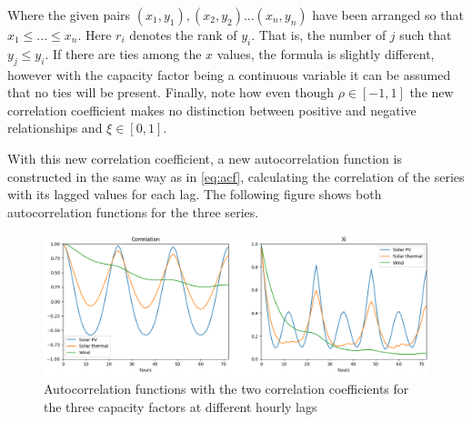 Where the given pairs $\left(x_1,y_1\right), \left(x_2,y_2\right)...\left(x_n,y_n\right)$ have been arranged so that $x_1 \leq...\leq x_n$. Here $r_i$ denotes the rank of $y_i$. That is, the number of $j$ such that $y_j\leq y_i$. If there are ties among the $x$ values, the formula is slightly different, however with the capacity factor being a continuous variable it can be assumed that no ties will be present. Finally, note how even though $\rho \in \left[-1,1\right]$ the new correlation coefficient makes no distinction between positive and negative relationships and $\xi \in \left[0,1\right]$.

With this new correlation coefficient, a new autocorrelation function is constructed in the same way as in \eqref{eq:acf}, calculating the correlation of the series with its lagged values for each lag. The following figure shows both autocorrelation functions for the three series. 

\begin{figure}[ht]
    \centering
    \captionsetup{justification=centering}
    \includegraphics[width=\linewidth]{assets/autocorrelation.png}
    \caption{Autocorrelation functions with the two correlation coefficients for the three capacity factors at different hourly lags}
    \label{fig:autocorrelation}
\end{figure}

